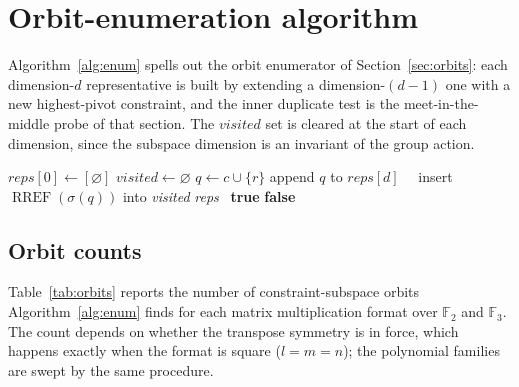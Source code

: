 \documentclass[11pt]{article}
\theoremstyle{definition}
\newcommand{\F}{\mathbb{F}}
\newcommand{\Kappa}{\mathrm{K}}
\newcommand{\RREF}{\operatorname{RREF}}
\begin{document}
\section{Orbit-enumeration algorithm}\label{app:enum}

Algorithm~\ref{alg:enum} spells out the orbit enumerator of
Section~\ref{sec:orbits}: each dimension-$d$ representative is built by extending
a dimension-$(d-1)$ one with a new highest-pivot constraint, and the inner
duplicate test is the meet-in-the-middle probe of that section. The
$\textit{visited}$ set is cleared at the start of each dimension, since the
subspace dimension is an invariant of the group action.

\begin{algorithm}[!ht]
  \caption{Enumerate constraint-subspace orbits}
  \label{alg:enum}
  \begin{algorithmic}[1]
    \State $\textit{reps}[0]\gets[\varnothing]$
    \State $\textit{visited}\gets\varnothing$
    \State $q \gets c \cup \{r\}$
    \State append $q$ to $\textit{reps}[d]$
    \For{$\sigma\in\Sigma$}\ \ insert $\RREF(\sigma(q))$ into \textit{visited}\EndFor
    \EndIf
    \EndFor
    \EndFor
    \EndFor
    \State \Return \textit{reps}
    \Statex
    \For{$\kappa\in\Kappa$}
    \If{$\RREF(\kappa(q))\in\textit{visited}$}\ \Return \textbf{true}\EndIf
    \EndFor
    \State \Return \textbf{false}
    \EndFunction
  \end{algorithmic}
\end{algorithm}

\subsection*{Orbit counts}\label{app:counts}

Table~\ref{tab:orbits} reports the number of constraint-subspace orbits Algorithm~\ref{alg:enum} finds
for each matrix multiplication format over $\F_2$ and $\F_3$. The count depends on whether the transpose
symmetry is in force, which happens exactly when the format is square ($l=m=n$);
the polynomial families are swept by the same procedure.
\end{document}
